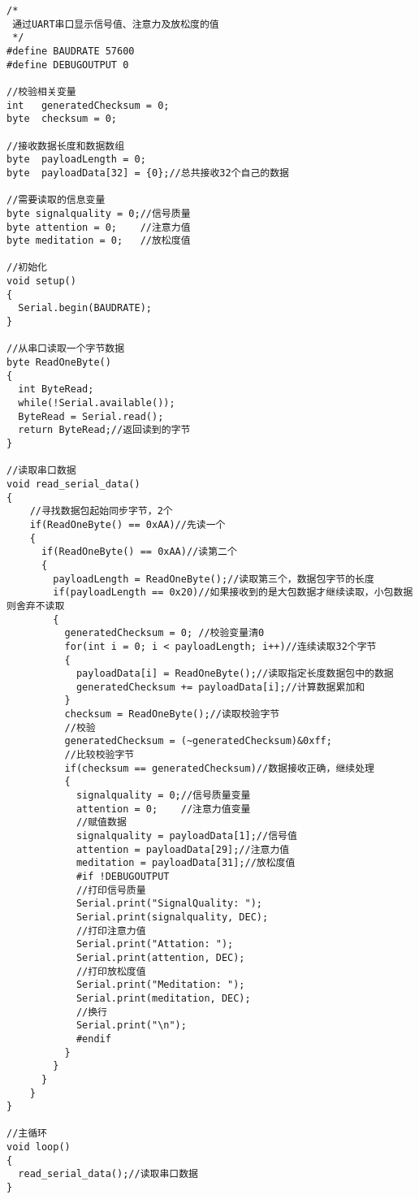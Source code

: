\begin{verbatim}
/*
 通过UART串口显示信号值、注意力及放松度的值
 */
#define BAUDRATE 57600
#define DEBUGOUTPUT 0

//校验相关变量
int   generatedChecksum = 0;
byte  checksum = 0; 

//接收数据长度和数据数组
byte  payloadLength = 0;
byte  payloadData[32] = {0};//总共接收32个自己的数据

//需要读取的信息变量
byte signalquality = 0;//信号质量
byte attention = 0;    //注意力值
byte meditation = 0;   //放松度值

//初始化
void setup() 
{
  Serial.begin(BAUDRATE); 
}

//从串口读取一个字节数据
byte ReadOneByte() 
{
  int ByteRead;
  while(!Serial.available());
  ByteRead = Serial.read();
  return ByteRead;//返回读到的字节
}

//读取串口数据
void read_serial_data()
{
    //寻找数据包起始同步字节，2个
    if(ReadOneByte() == 0xAA)//先读一个
    {
      if(ReadOneByte() == 0xAA)//读第二个
      {
        payloadLength = ReadOneByte();//读取第三个，数据包字节的长度
        if(payloadLength == 0x20)//如果接收到的是大包数据才继续读取，小包数据则舍弃不读取
        {
          generatedChecksum = 0; //校验变量清0       
          for(int i = 0; i < payloadLength; i++)//连续读取32个字节
          {  
            payloadData[i] = ReadOneByte();//读取指定长度数据包中的数据
            generatedChecksum += payloadData[i];//计算数据累加和
          }         
          checksum = ReadOneByte();//读取校验字节  
          //校验
          generatedChecksum = (~generatedChecksum)&0xff;       
          //比较校验字节
          if(checksum == generatedChecksum)//数据接收正确，继续处理 
          {    
            signalquality = 0;//信号质量变量
            attention = 0;    //注意力值变量
            //赋值数据
            signalquality = payloadData[1];//信号值      
            attention = payloadData[29];//注意力值
            meditation = payloadData[31];//放松度值
            #if !DEBUGOUTPUT         
            //打印信号质量
            Serial.print("SignalQuality: ");
            Serial.print(signalquality, DEC);
            //打印注意力值
            Serial.print("Attation: ");
            Serial.print(attention, DEC);
            //打印放松度值
            Serial.print("Meditation: ");
            Serial.print(meditation, DEC);
            //换行
            Serial.print("\n");       
            #endif              
          } 
        } 
      }
    }
}

//主循环
void loop() 
{
  read_serial_data();//读取串口数据 
}

\end{verbatim}